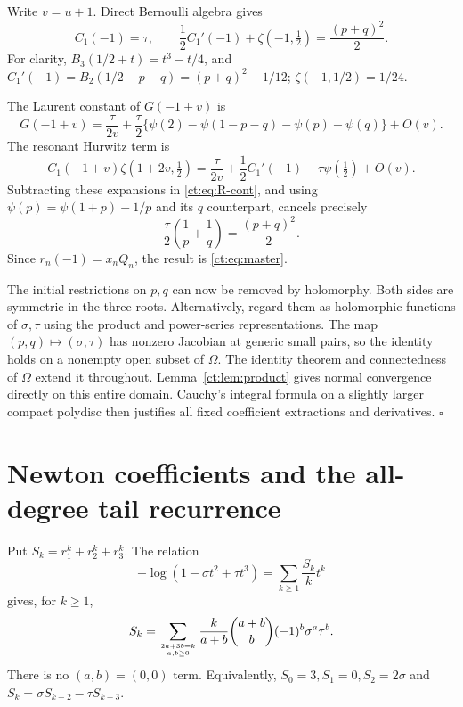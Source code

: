 \documentclass[11pt]{article}
\numberwithin{equation}{section}
\theoremstyle{definition}\newtheorem{definition}[theorem]{Definition}
\theoremstyle{remark}\newtheorem{remark}[theorem]{Remark}
\newcommand{\Om}{\Omega}
\begin{document}
Write $v=u+1$. Direct Bernoulli algebra gives
\begin{equation}\label{ct:eq:C1}
 C_1(-1)=\tau,\qquad
 \frac12C_1'(-1)+\zeta(-1,\tfrac12)=\frac{(p+q)^2}{2}.
\end{equation}
For clarity, $B_3(1/2+t)=t^3-t/4$, and
$C_1'(-1)=B_2(1/2-p-q)=(p+q)^2-1/12$;
$\zeta(-1,1/2)=1/24$.

The Laurent constant of $G(-1+v)$ is
\begin{equation}\label{ct:eq:G-constant}
 G(-1+v)=\frac{\tau}{2v}
 +\frac\tau2\{\psi(2)-\psi(1-p-q)-\psi(p)-\psi(q)\}+O(v).
\end{equation}
The resonant Hurwitz term is
\[
 C_1(-1+v)\zeta(1+2v,\tfrac12)
 =\frac\tau{2v}+\frac12C_1'(-1)-\tau\psi(\tfrac12)+O(v).
\]
Subtracting these expansions in \eqref{ct:eq:R-cont}, and using
$\psi(p)=\psi(1+p)-1/p$ and its $q$ counterpart, cancels precisely
\[
 \frac\tau2\left(\frac1p+\frac1q\right)
       =\frac{(p+q)^2}{2}.
\]
Since $r_n(-1)=x_nQ_n$, the result is \eqref{ct:eq:master}.

The initial restrictions on $p,q$ can now be removed by holomorphy. Both
sides are symmetric in the three roots. Alternatively, regard them as
holomorphic functions of $\sigma,\tau$ using the product and power-series
representations. The map $(p,q)\mapsto(\sigma,\tau)$ has nonzero Jacobian
at generic small pairs, so the identity holds on a nonempty open subset of
$\Om$. The identity theorem and connectedness of $\Om$ extend it throughout.
Lemma~\ref{ct:lem:product} gives normal convergence directly on this entire
domain. Cauchy's integral formula on a slightly larger compact polydisc
then justifies all fixed coefficient extractions and derivatives.
\hfill$\square$

\section{Newton coefficients and the all-degree tail recurrence}
\label{ct:sec:coefficients}
Put $S_k=r_1^k+r_2^k+r_3^k$. The relation
\begin{equation}\label{ct:eq:newton-log}
 -\log(1-\sigma t^2+\tau t^3)=\sum_{k\ge1}\frac{S_k}{k}t^k
\end{equation}
gives, for $k\ge1$,
\begin{equation}\label{ct:eq:newton}
 S_k=\sum_{2a+3b=k\atop a,b\ge0}
 \frac{k}{a+b}\binom{a+b}{b}(-1)^b\sigma^a\tau^b.
\end{equation}
There is no $(a,b)=(0,0)$ term. Equivalently,
$S_0=3,S_1=0,S_2=2\sigma$ and $S_k=\sigma S_{k-2}-\tau S_{k-3}$.
\end{document}
